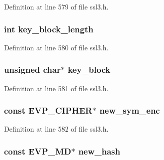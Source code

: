 Definition at line 579 of file ssl3.\+h.

\subsubsection[{\texorpdfstring{key\+\_\+block\+\_\+length}{key_block_length}}]{\setlength{\rightskip}{0pt plus 5cm}int key\+\_\+block\+\_\+length}\hypertarget{structssl3__state__st_adac13d3919b8f55cac70d7f1c164ea92}{}\label{structssl3__state__st_adac13d3919b8f55cac70d7f1c164ea92}


Definition at line 580 of file ssl3.\+h.

\subsubsection[{\texorpdfstring{key\+\_\+block}{key_block}}]{\setlength{\rightskip}{0pt plus 5cm}unsigned char$\ast$ key\+\_\+block}\hypertarget{structssl3__state__st_a38030334eea705084c1bcb8804d58409}{}\label{structssl3__state__st_a38030334eea705084c1bcb8804d58409}


Definition at line 581 of file ssl3.\+h.

\subsubsection[{\texorpdfstring{new\+\_\+sym\+\_\+enc}{new_sym_enc}}]{\setlength{\rightskip}{0pt plus 5cm}const {\bf E\+V\+P\+\_\+\+C\+I\+P\+H\+ER}$\ast$ new\+\_\+sym\+\_\+enc}\hypertarget{structssl3__state__st_ab3f6ae565f494cd1cd873104945d437a}{}\label{structssl3__state__st_ab3f6ae565f494cd1cd873104945d437a}


Definition at line 582 of file ssl3.\+h.

\subsubsection[{\texorpdfstring{new\+\_\+hash}{new_hash}}]{\setlength{\rightskip}{0pt plus 5cm}const {\bf E\+V\+P\+\_\+\+MD}$\ast$ new\+\_\+hash}\hypertarget{structssl3__state__st_a0ebd015a987d489ed611a1d24d275724}{}\label{structssl3__state__st_a0ebd015a987d489ed611a1d24d275724}


